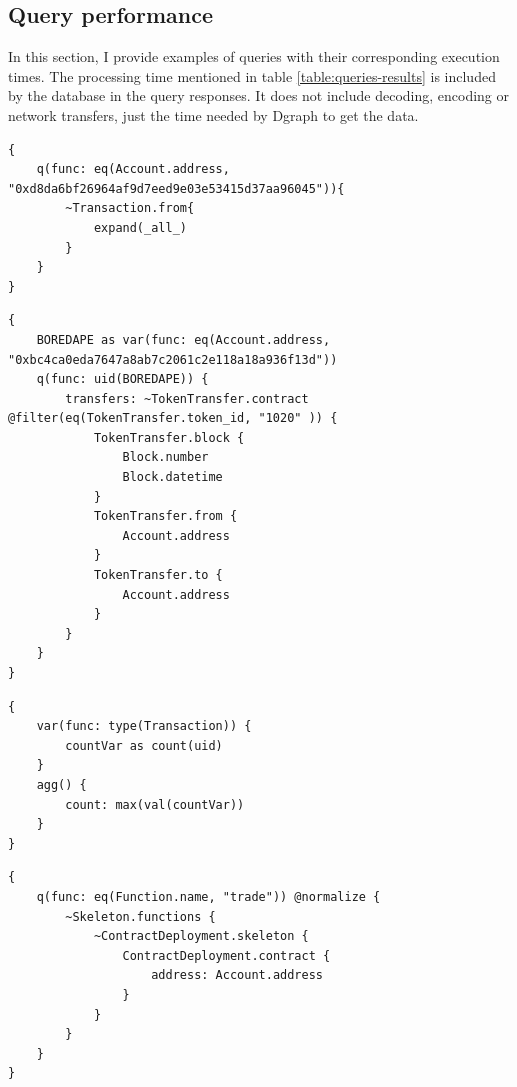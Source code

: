 \subsection{Query performance}

In this section, I provide examples of queries with their corresponding execution times. The processing time mentioned in table \cref{table:queries-results} is included by the database in the query responses. It does not include decoding, encoding or network transfers, just the time needed by Dgraph to get the data.

\begin{lstlisting}[caption={Query to get all the transactions sent by a specific address. Response included 1071 transactions.},label={lst:query-1},captionpos=b,numbers=none]
{
    q(func: eq(Account.address, "0xd8da6bf26964af9d7eed9e03e53415d37aa96045")){
        ~Transaction.from{
            expand(_all_)
        }
    }
}
\end{lstlisting}

\begin{lstlisting}[caption={Query to get all the transfers of BoredApe NFT with id \textit{1020} (686 transfers).},label={lst:query-2},captionpos=b,numbers=none]
{
    BOREDAPE as var(func: eq(Account.address, "0xbc4ca0eda7647a8ab7c2061c2e118a18a936f13d"))
	q(func: uid(BOREDAPE)) {
        transfers: ~TokenTransfer.contract @filter(eq(TokenTransfer.token_id, "1020" )) {
            TokenTransfer.block {
                Block.number
                Block.datetime
            }
            TokenTransfer.from {
                Account.address
            }
            TokenTransfer.to {
                Account.address
            }
        }
	}
}
\end{lstlisting}

\begin{lstlisting}[caption={Query to count all the transactions in the database.},label={lst:query-3},captionpos=b,numbers=none]
{
    var(func: type(Transaction)) {
        countVar as count(uid)
 	}
    agg() {
        count: max(val(countVar))
    }
}
\end{lstlisting}

\begin{lstlisting}[caption={Query to get the addresses of contracts that implement a function with name \textit{trade} (554 addresses).},label={lst:query-4},captionpos=b,numbers=none]
{
    q(func: eq(Function.name, "trade")) @normalize {
        ~Skeleton.functions {
            ~ContractDeployment.skeleton {
                ContractDeployment.contract {
                    address: Account.address
                }
            }
        }
    }
}
\end{lstlisting}

